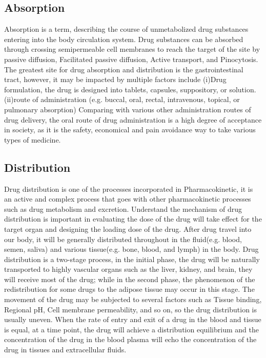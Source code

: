 \documentclass[12pt]{article}
\begin{document}
\subsection{Absorption}
Absorption is a term, describing the course of unmetabolized drug substances entering into the body circulation system. Drug substances can be absorbed through crossing semipermeable cell membranes to reach the target of the site by passive diffusion, Facilitated passive diffusion, Active transport, and Pinocytosis. The greatest site for drug absorption and distribution is the gastrointestinal tract, however, it may be impacted by multiple factors include (i)Drug formulation, the drug is designed into tablets, capsules, suppository, or solution. (ii)route of administration (e.g. buccal, oral, rectal, intravenous, topical, or pulmonary absorption) Comparing with various other administration routes of drug delivery, the oral route of drug administration is a high degree of acceptance in society, as it is the safety, economical and pain avoidance way to take various types of medicine.


\subsection{Distribution}
Drug distribution is one of the processes incorporated in Pharmacokinetic, it is an active and complex process that goes with other pharmacokinetic processes such as drug metabolism and excretion. Understand the mechanism of drug distribution is important in evaluating the dose of the drug will take effect for the target organ and designing the loading dose of the drug. After drug travel into our body, it will be generally distributed throughout in the fluid(e.g. blood, semen, saliva) and various tissue(e.g. bone, blood, and lymph) in the body. Drug distribution is a two-stage process, in the initial phase, the drug will be naturally transported to highly vascular organs such as the liver, kidney, and brain, they will receive most of the drug; while in the second phase, the phenomenon of the redistribution for some drugs to the adipose tissue may occur in this stage. The movement of the drug may be subjected to several factors such as Tissue binding, Regional pH, Cell membrane permeability, and so on, so the drug distribution is usually uneven. When the rate of entry and exit of a drug in the blood and tissue is equal, at a time point, the drug will achieve a distribution equilibrium and the concentration of the drug in the blood plasma will echo the concentration of the drug in tissues and extracellular fluids.
\end{document}
